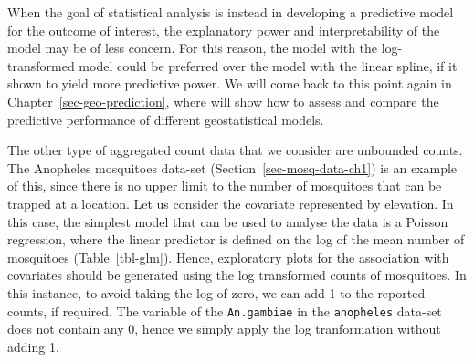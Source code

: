 \documentclass[
  letterpaper,
]{krantz}
\newenvironment{Shaded}{\begin{snugshade}}{\end{snugshade}}
\newcommand{\AttributeTok}[1]{\textcolor[rgb]{0.13,0.29,0.53}{#1}}
\newcommand{\CommentTok}[1]{\textcolor[rgb]{0.56,0.35,0.01}{\textit{#1}}}
\newcommand{\ConstantTok}[1]{\textcolor[rgb]{0.56,0.35,0.01}{#1}}
\newcommand{\FunctionTok}[1]{\textcolor[rgb]{0.13,0.29,0.53}{\textbf{#1}}}
\newcommand{\NormalTok}[1]{#1}
\newcommand{\OtherTok}[1]{\textcolor[rgb]{0.56,0.35,0.01}{#1}}
\newcommand{\SpecialCharTok}[1]{\textcolor[rgb]{0.81,0.36,0.00}{\textbf{#1}}}
\newcommand{\StringTok}[1]{\textcolor[rgb]{0.31,0.60,0.02}{#1}}
\begin{document}
When the goal of statistical analysis is instead in developing a
predictive model for the outcome of interest, the explanatory power and
interpretability of the model may be of less concern. For this reason,
the model with the log-transformed model could be preferred over the
model with the linear spline, if it shown to yield more predictive
power. We will come back to this point again in
Chapter~\ref{sec-geo-prediction}, where will show how to assess and
compare the predictive performance of different geostatistical models.

The other type of aggregated count data that we consider are unbounded
counts. The Anopheles mosquitoes data-set
(Section~\ref{sec-mosq-data-ch1}) is an example of this, since there is
no upper limit to the number of mosquitoes that can be trapped at a
location. Let us consider the covariate represented by elevation. In
this case, the simplest model that can be used to analyse the data is a
Poisson regression, where the linear predictor is defined on the log of
the mean number of mosquitoes (Table~\ref{tbl-glm}). Hence, exploratory
plots for the association with covariates should be generated using the
log transformed counts of mosquitoes. In this instance, to avoid taking
the log of zero, we can add 1 to the reported counts, if required. The
variable of the \texttt{An.gambiae} in the \texttt{anopheles} data-set
does not contain any 0, hence we simply apply the log tranformation
without adding 1.

\begin{Shaded}
\end{Shaded}
\end{document}
